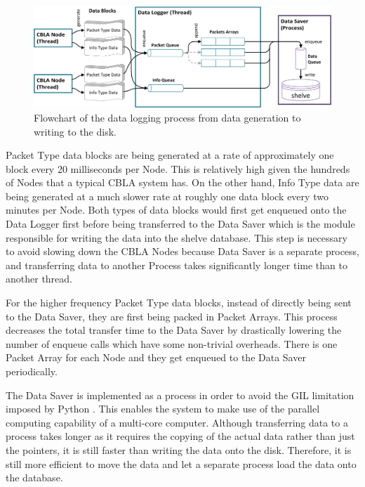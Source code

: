 \begin{figure}[!htbp]
	\centering
	\includegraphics[width=1.0 \textwidth]{"fig/interactive control system/DataLogger process"}
	\caption[Flowchart of the data logging process]{Flowchart of the data logging process from data generation to writing to the disk.}
	\label{fig:DataLogger process}
\end{figure}

Packet Type data blocks are being generated at a rate of approximately one block every 20 milliseconds per Node. This is relatively high given the hundreds of Nodes that a typical CBLA system has. On the other hand, Info Type data are being generated at a much slower rate at roughly one data block every two minutes per Node. Both types of data blocks would first get enqueued onto the Data Logger first before being transferred to the Data Saver which is the module responsible for writing the data into the shelve database. This step is necessary to avoid slowing down the CBLA Nodes because Data Saver is a separate process, and transferring data to another Process takes significantly longer time than to another thread. 

For the higher frequency Packet Type data blocks, instead of directly being sent to the Data Saver, they are first being packed in Packet Arrays. This process decreases the total transfer time to the Data Saver by drastically lowering the number of enqueue calls which have some non-trivial overheads. There is one Packet Array for each Node and they get enqueued to the Data Saver periodically. 

The Data Saver is implemented as a process in order to avoid the GIL limitation imposed by Python \cite{Beazley2005}. This enables the system to make use of the parallel computing capability of a multi-core computer. Although transferring data to a process takes longer as it requires the copying of the actual data rather than just the pointers, it is still faster than writing the data onto the disk. Therefore, it is still more efficient to move the data and let a separate process load the data onto the database.

